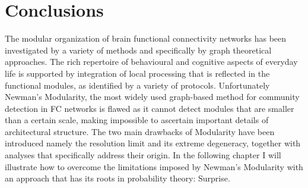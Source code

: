 \section{Conclusions}
The modular organization of brain functional connectivity networks has been investigated by a variety of methods and specifically by graph theoretical approaches. The rich repertoire of behavioural and cognitive aspects of everyday life is supported by integration of local processing that is reflected in the functional modules, as identified by a variety of protocols.
Unfortunately Newman's Modularity, the most widely used graph-based method for community detection in FC networks is flawed as it cannot detect modules that are smaller than a certain scale, making impossible to ascertain important details of architectural structure.
The two main drawbacks of Modularity have been introduced namely the resolution limit and its extreme degeneracy, together with analyses that specifically address their origin. In the following chapter I will illustrate how to overcome the limitations imposed by Newman's Modularity with an approach that has its roots in probability theory: Surprise.

